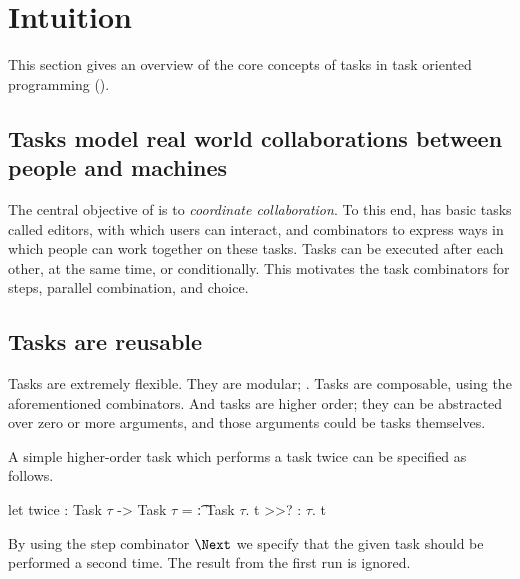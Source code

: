 


\section{Intuition}
\label{sec:intuition}

This section gives an overview of the core concepts of tasks in task oriented
programming (\TOP).



\subsection{Tasks model real world collaborations between people and machines}

The central objective of \TOP is to \emph{coordinate collaboration}.
To this end, \TOPHAT has basic tasks called editors, with which users can
interact, and combinators to express ways in which people can work together on
these tasks. Tasks can be executed after each other, at the same time, or
conditionally. This motivates the task combinators for steps, parallel
combination, and choice.



\subsection{Tasks are reusable}

Tasks are extremely flexible. They are modular; . Tasks are
composable, using the aforementioned combinators. And tasks are higher order;
they can be abstracted over zero or more arguments, and those arguments could
be tasks themselves.

\begin{example}[Twice]

A simple higher-order task which performs a task twice can be specified as
follows.
\begin{TASK}
  let twice : Task $\tau$ -> Task $\tau$ = \t : Task $\tau$. t >>? \x : $\tau$. t
\end{TASK}
By using the step combinator $\Next$ we specify that the given task 
should be performed a second time. The result  from the first run is
ignored.

\end{example}




